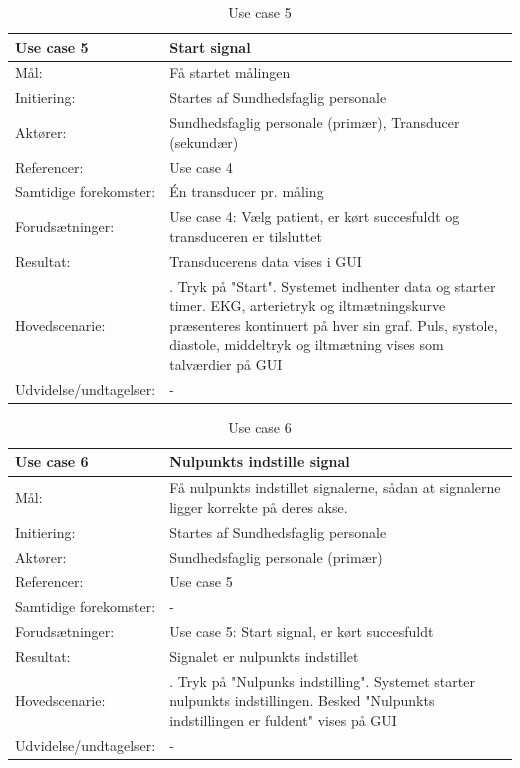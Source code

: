 \begin{table}[H]
\caption{Use case 5}\label{tab:tabel3}
\begin{tabular}{| l | >{\raggedright\arraybackslash}p{11cm} |}
   \hline
   \textbf{Use case 5} & \textbf{Start signal}\\ \hline
   Mål: & Få startet målingen \\ \hline
   Initiering: & Startes af Sundhedsfaglig personale\\ \hline
   Aktører:& Sundhedsfaglig personale (primær), Transducer (sekundær)\\ \hline
   Referencer: & Use case 4\\ \hline
   Samtidige forekomster: & Én transducer pr. måling  \\\hline
   Forudsætninger: & Use case 4: Vælg patient, er kørt succesfuldt og transduceren er tilsluttet\\ \hline
   Resultat:& Transducerens data vises i GUI \\ \hline
   Hovedscenarie:& 
1. Tryk på "Start"\newline
2. Systemet indhenter data og starter timer\newline
3. EKG, arterietryk og iltmætningskurve præsenteres kontinuert på hver sin graf. Puls, systole, diastole, middeltryk og iltmætning vises som talværdier på GUI\\\hline
Udvidelse/undtagelser: & - \\\hline
\end{tabular}
\end{table}


\begin{table}[H]
\caption{Use case 6}\label{tab:tabel3}
\begin{tabular}{| l | >{\raggedright\arraybackslash}p{11cm} |}
   \hline
   \textbf{Use case 6} & \textbf{Nulpunkts indstille signal}\\ \hline
   Mål: & Få nulpunkts indstillet signalerne, sådan at signalerne ligger korrekte på deres akse. \\ \hline
   Initiering: & Startes af Sundhedsfaglig personale\\ \hline
   Aktører:& Sundhedsfaglig personale (primær)\\ \hline
   Referencer: & Use case 5\\ \hline
   Samtidige forekomster: & -  \\\hline
   Forudsætninger: & Use case 5: Start signal, er kørt succesfuldt\\ \hline
   Resultat:& Signalet er nulpunkts indstillet\\ \hline
   Hovedscenarie:& 
1. Tryk på "Nulpunks indstilling"\newline
2. Systemet starter nulpunkts indstillingen\newline
3. Besked "Nulpunkts indstillingen er fuldent" vises på GUI\\\hline
Udvidelse/undtagelser: & - \\\hline
\end{tabular}
\end{table}


